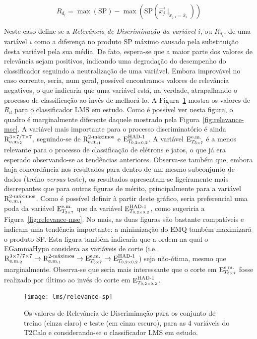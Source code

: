 \begin{equation}
R_{d_i} = \max(\text{SP}) - \max(\text{SP}(\overrightarrow{x_j}\mid_{x_{j,i} = \overline{x}_i}))
\label{eq:relevance-sp}
\end{equation}

Neste caso define-se a \textit{Relevância de Discriminação da variável $i$},
ou $R_{d_i}$, de uma variável $i$ como a diferença no produto SP máximo
causado pela substituição desta variável pela sua média. De fato, espera-se
que a maior parte dos valores de relevância sejam positivos, indicando uma
degradação do desempenho do classificador seguindo a neutralização de uma
variável. Embora improvável no caso corrente, seria, num geral, possível
encontramos valores de relevância negativos, o que indicaria que uma variável
está, na verdade, atrapalhando o processo de classificação ao invés de
melhorá-lo. A Figura~\ref{fig:relevance-sp} mostra os valores de $R_d$ para o
classificador LMS em estudo. Como é possível ver nesta figura, o quadro é
marginalmente diferente daquele mostrado pela
Figura~\ref{fig:relevance-mse}. A variável mais importante para o processo
discriminatório é ainda $\rcore$, seguindo-se de $\eratio$ e $\ethad$. A
variável $\etem$ é a menos relevante para o processo de classificação de
elétrons e jatos, o que já era esperado observando-se as tendências
anteriores. Observa-se também que, embora haja concordância nos resultados
para dentro de um mesmo subconjunto de dados (treino \textit{versus} teste),
os resultados apresentam-se ligeiramente mais discrepantes que para outras
figuras de mérito, principalmente para a variável $\eratio$. Como é possível
definir à partir deste gráfico, seria preferencial uma poda da variável
$\etem$ que da variável $\ethad$, como sugeriria a
Figura~\ref{fig:relevance-mse}. No mais, as duas figuras são bastante
compatíveis e indicam uma tendência importante: a minimização do EMQ também
maximizará o produto SP. Esta figura também indicaria que a ordem na qual o
EGammaHypo considera as variáveis de corte (i.e. $\rcore \rightarrow
\eratio \rightarrow \etem \rightarrow \ethad$) seja não-ótima, mesmo que
marginalmente. Observa-se que seria mais interessante que o corte em $\etem$
fosse realizado por último ao invés do corte em $\ethad$.

\begin{figure}
\begin{center}
\texttt{[image: lms/relevance-sp]}
\end{center}
\caption{Os valores de Relevância de Discriminação para os conjunto de treino
(cinza claro) e teste (em cinza escuro), para as 4 variáveis do T2Calo e
considerando-se o classificador LMS em estudo.}
\label{fig:relevance-sp}
\end{figure}

